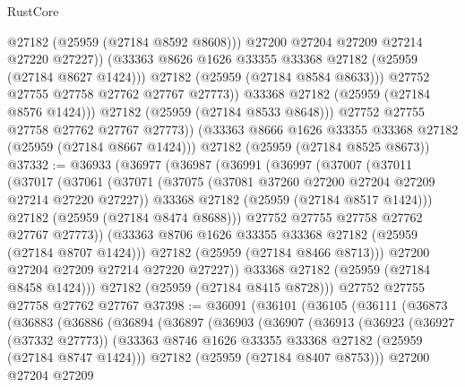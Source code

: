 \begin{lexlean}{RustCore}
\begin{coremodule}
                        @27182
                        (@25959 (@27184 @8592 @8608)))
                      @27200
                      @27204
                      @27209
                      @27214
                      @27220
                      @27227))
                  (@33363 @8626 @1626 @33355 @33368 @27182 (@25959 (@27184 @8627 @1424)))
                  @27182
                  (@25959 (@27184 @8584 @8633)))
                @27752
                @27755
                @27758
                @27762
                @27767
                @27773))
            @33368
            @27182
            (@25959 (@27184 @8576 @1424)))
          @27182
          (@25959 (@27184 @8533 @8648)))
        @27752
        @27755
        @27758
        @27762
        @27767
        @27773))
    (@33363 @8666 @1626 @33355 @33368 @27182 (@25959 (@27184 @8667 @1424)))
    @27182
    (@25959 (@27184 @8525 @8673))
@37332 := @36933
    (@36977
      (@36987
        (@36991
          (@36997
            (@37007
              (@37011
                (@37017
                  (@37061
                    (@37071
                      (@37075 (@37081 @37260 @27200 @27204 @27209 @27214 @27220 @27227))
                      @33368
                      @27182
                      (@25959 (@27184 @8517 @1424)))
                    @27182
                    (@25959 (@27184 @8474 @8688)))
                  @27752
                  @27755
                  @27758
                  @27762
                  @27767
                  @27773))
              (@33363 @8706 @1626 @33355 @33368 @27182 (@25959 (@27184 @8707 @1424)))
              @27182
              (@25959 (@27184 @8466 @8713)))
            @27200
            @27204
            @27209
            @27214
            @27220
            @27227))
        @33368
        @27182
        (@25959 (@27184 @8458 @1424)))
      @27182
      (@25959 (@27184 @8415 @8728)))
    @27752
    @27755
    @27758
    @27762
    @27767
@37398 := @36091
    (@36101
      (@36105
        (@36111
          (@36873
            (@36883
              (@36886
                (@36894
                  (@36897
                    (@36903
                      (@36907
                        (@36913
                          (@36923
                            (@36927 (@37332 @27773))
                            (@33363 @8746 @1626 @33355 @33368 @27182 (@25959 (@27184 @8747 @1424)))
                            @27182
                            (@25959 (@27184 @8407 @8753)))
                          @27200
                          @27204
                          @27209

\end{coremodule}
\end{lexlean}
